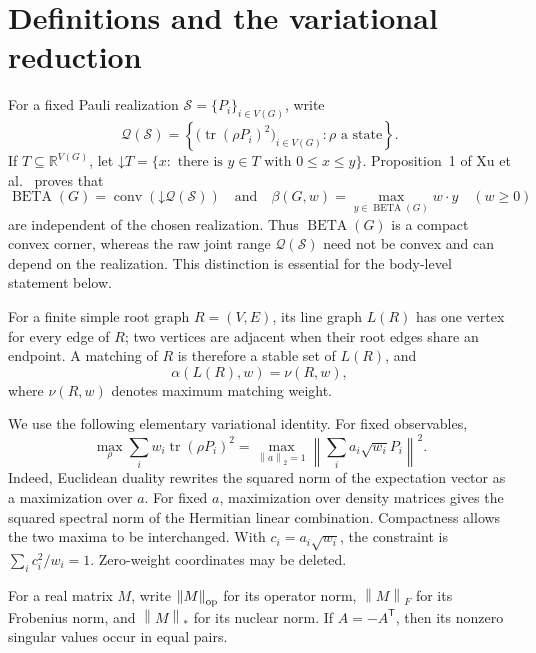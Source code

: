 \documentclass[11pt,a4paper]{article}
\theoremstyle{remark}
\newcommand{\norm}[1]{\left\lVert#1\right\rVert}
\newcommand{\tr}{\operatorname{tr}}
\newcommand{\BETA}{\operatorname{BETA}}
\newcommand{\R}{\mathbb R}
\begin{document}
\section{Definitions and the variational reduction}

For a fixed Pauli realization $\mathcal S=\{P_i\}_{i\in V(G)}$, write
\[
 \mathcal Q(\mathcal S)=
 \left\{\bigl(\tr(\rho P_i)^2\bigr)_{i\in V(G)}:\rho\text{ a state}\right\}.
\]
If $T\subseteq\R^{V(G)}$, let
$\mathord\downarrow T=\{x:\text{ there is }y\in T\text{ with }0\leq x\leq y\}$.
Proposition~1 of Xu et al.~\cite{xu} proves that
\begin{equation}\label{eq:beta-body}
 \BETA(G)=\operatorname{conv}(\mathord\downarrow\mathcal Q(\mathcal S))
 \quad\text{and}\quad
 \beta(G,w)=\max_{y\in\BETA(G)}w\mathbin{\cdot}y
 \quad(w\geq0)
\end{equation}
are independent of the chosen realization. Thus $\BETA(G)$ is a compact
convex corner, whereas the raw joint range $\mathcal Q(\mathcal S)$ need not be
convex and can depend on the realization. This distinction is essential for
the body-level statement below.

For a finite simple root graph $R=(V,E)$, its line graph $L(R)$ has one vertex
for every edge of $R$; two vertices are adjacent when their root edges share
an endpoint. A matching of $R$ is therefore a stable set of $L(R)$, and
\begin{equation}\label{eq:alpha-nu}
 \alpha(L(R),w)=\nu(R,w),
\end{equation}
where $\nu(R,w)$ denotes maximum matching weight.

We use the following elementary variational identity. For fixed observables,
\begin{equation}\label{eq:variational}
 \max_\rho\sum_i w_i\tr(\rho P_i)^2
 =\max_{\norm{a}_2=1}\norm{\sum_i a_i\sqrt{w_i}P_i}^2.
\end{equation}
Indeed, Euclidean duality rewrites the squared norm of the expectation vector
as a maximization over $a$. For fixed $a$, maximization over density matrices
gives the squared spectral norm of the Hermitian linear combination. Compactness
allows the two maxima to be interchanged. With
$c_i=a_i\sqrt{w_i}$, the constraint is
$\sum_i c_i^2/w_i=1$. Zero-weight coordinates may be deleted.

For a real matrix $M$, write $\norm{M}_{\rm op}$ for its operator norm,
$\norm{M}_F$ for its Frobenius norm, and $\norm{M}_*$ for its nuclear norm.
If $A=-A^{\mathsf T}$, then its nonzero singular values occur in equal pairs.
\end{document}

